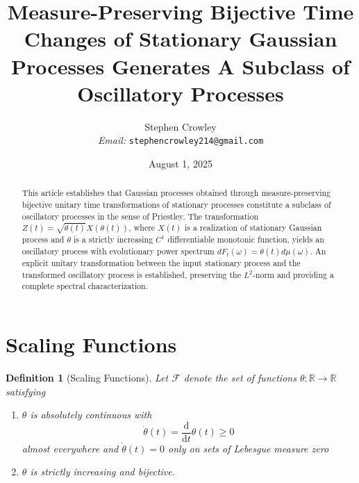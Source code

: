 \documentclass{article}
\newcommand{\mathd}{\mathrm{d}}
\newcommand{\tmemail}[1]{\\ \textit{Email:} \texttt{#1}}
\newtheorem{definition}{Definition}
\begin{document}
\title{Measure-Preserving Bijective Time Changes of Stationary Gaussian Processes Generates A Subclass of Oscillatory Processes}

\author{
  Stephen Crowley
  \tmemail{stephencrowley214@gmail.com}
}

\date{August 1, 2025}

\maketitle

\begin{abstract}
  This article establishes that Gaussian processes obtained through
  measure-preserving bijective unitary time transformations of stationary
  processes constitute a subclass of oscillatory processes in the sense of
  Priestley{\cite{priestley1965}}. The transformation $Z (t) = \sqrt{\dot{\theta} (t)} X (\theta
  (t))$, where $X (t)$ is a realization of stationary Gaussian process and
  $\theta$ is a strictly increasing $C^1$ differentiable monotonic function,
  yields an oscillatory process with evolutionary power spectrum $dF_t
  (\omega) = \dot{\theta} (t) d \mu (\omega)$. An explicit unitary
  transformation between the input stationary process and the transformed
  oscillatory process is established, preserving the $L^2$-norm and providing
  a complete spectral characterization.
\end{abstract}

{\tableofcontents}

\section{Scaling Functions}\label{sec:scaling}

\begin{definition}
  [Scaling Functions]\label{def:scaling} Let $\mathcal{F}$ denote the set of
  functions $\theta : \mathbb{R} \to \mathbb{R}$ satisfying
  \begin{enumerate}
    \item $\theta$ is absolutely continuous with
    \begin{equation}
      \dot{\theta} (t) = \frac{\mathd}{\mathd t} \theta (t) \geq 0
    \end{equation}
    almost everywhere and $\dot{\theta} (t) = 0$ only on sets of Lebesgue
    measure zero
    
    \item $\theta$ is strictly increasing and bijective.
  \end{enumerate}
\end{definition}
\end{document}
